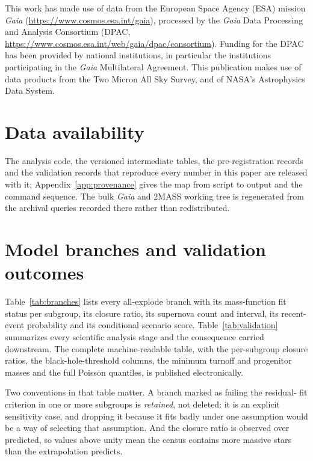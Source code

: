 \documentclass{aa}
\begin{document}
\begin{acknowledgements}
This work has made use of data from the European Space Agency (ESA) mission
\textit{Gaia} (\url{https://www.cosmos.esa.int/gaia}), processed by the
\textit{Gaia} Data Processing and Analysis Consortium (DPAC,
\url{https://www.cosmos.esa.int/web/gaia/dpac/consortium}). Funding for the DPAC
has been provided by national institutions, in particular the institutions
participating in the \textit{Gaia} Multilateral Agreement. This publication
makes use of data products from the Two Micron All Sky Survey, and of NASA's
Astrophysics Data System.
\end{acknowledgements}

\section*{Data availability}
The analysis code, the versioned intermediate tables, the pre-registration
records and the validation records that reproduce every number in this paper are
released with it; Appendix~\ref{app:provenance} gives the map from script to
output and the command sequence. The bulk \textit{Gaia} and 2MASS working tree
is regenerated from the archival queries recorded there rather than
redistributed.




\appendix

\section{Model branches and validation outcomes}\label{app:branches}

Table~\ref{tab:branches} lists every all-explode branch with its mass-function
fit status per subgroup, its closure ratio, its supernova count and interval,
its recent-event probability and its conditional scenario score.
Table~\ref{tab:validation} summarizes every scientific analysis stage and the
consequence carried downstream. The complete machine-readable table, with the per-subgroup
closure ratios, the black-hole-threshold columns, the minimum turnoff and
progenitor masses and the full Poisson quantiles, is published electronically.

Two conventions in that table matter. A branch marked as failing the residual-
fit criterion in one or more subgroups is \emph{retained}, not deleted: it is an explicit
sensitivity case, and dropping it because it fits badly under one assumption
would be a way of selecting that assumption. And the closure ratio is observed
over predicted, so values above unity mean the census contains more massive
stars than the extrapolation predicts.
\end{document}
